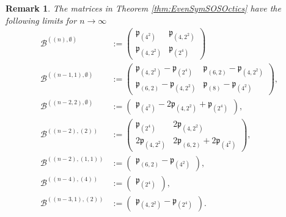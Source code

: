 \documentclass[11pt,a4paper]{amsart}
\numberwithin{equation}{section}
\newtheorem{remark}[thm]{Remark}
\theoremstyle{definition}
\numberwithin{thm}{section}
\theoremstyle{break}
\numberwithin{subcase}{case}
\begin{document}
\begin{remark} 
 The matrices in Theorem \ref{thm:EvenSymSOSOctics} have the following limits for $n \rightarrow \infty$
\begin{align*}
    \mathcal{B}^{((n),\emptyset)} & :=  \left( \begin{array}{cc} \mathfrak{p}_{(4^2)} & \mathfrak{p}_{(4,2^2)} \\ \mathfrak{p}_{(4,2^2)}&  \mathfrak{p}_{(2^4)}\end{array}\right)  \\
    \mathcal{B}^{((n-1,1),\emptyset)} & :=  \left( \begin{array}{cc} \mathfrak{p}_{(4,2^2)} -\mathfrak{p}_{(2^4)} & \mathfrak{p}_{(6,2)}-\mathfrak{p}_{(4,2^2)} \\ \mathfrak{p}_{(6,2)}-\mathfrak{p}_{(4,2^2)} & \mathfrak{p}_{(8)}-\mathfrak{p}_{(4^2)} \end{array} \right), \\
     \mathcal{B}^{((n-2,2),\emptyset)} & := \left( \begin{array}{c} \mathfrak{p}_{(4^2)} -2\mathfrak{p}_{(4,2^2)}+\mathfrak{p}_{(2^4)} \end{array}\right), \\
     \mathcal{B}^{((n-2),(2))} & := \left( \begin{array}{cc}
        \mathfrak{p}_{(2^4)}   & 2 \mathfrak{p}_{(4,2^2)} \\
       2\mathfrak{p}_{(4,2^2)}   &  2 \mathfrak{p}_{(6,2)}+2\mathfrak{p}_{(4^2)}
     \end{array} \right), \\
      \mathcal{B}^{((n-2),(1,1))} & :=  \left( \begin{array}{c} \mathfrak{p}_{(6,2)}-\mathfrak{p}_{(4^2)} \end{array}\right), \\
       \mathcal{B}^{((n-4),(4))} & := \left( \begin{array}{c} \mathfrak{p}_{(2^4)} \end{array}\right), \\
        \mathcal{B}^{((n-3,1),(2))} & :=  \left( \begin{array}{c} \mathfrak{p}_{(4,2^2)}-\mathfrak{p}_{(2^4)} \end{array} \right). 
\end{align*}
\end{remark}
\end{document}

